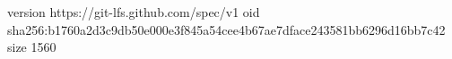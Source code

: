 version https://git-lfs.github.com/spec/v1
oid sha256:b1760a2d3c9db50e000e3f845a54cee4b67ae7dface243581bb6296d16bb7c42
size 1560
